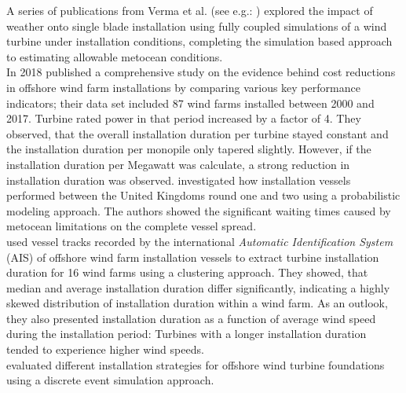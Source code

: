 \documentclass[wes, manuscript]{copernicus}
\begin{document}
A series of publications from Verma et al. (see e.g.: \citet{verma_numerical_2017, verma_response-based_2019, verma_comprehensive_2019, verma_impact_2019, verma_effects_2020}) explored the impact of weather onto single blade installation using fully coupled simulations of a wind turbine under installation conditions, completing the simulation based approach to estimating allowable metocean conditions.\\

In 2018 \citet{lacal-arantegui_offshore_2018} published a comprehensive study on the evidence behind cost reductions in offshore wind farm installations by comparing various key performance indicators; their data set included 87 wind farms installed between 2000 and 2017. Turbine rated power in that period increased by a factor of 4. They observed, that the overall installation duration per turbine stayed constant and the installation duration per monopile only tapered slightly. However, if the installation duration per Megawatt was calculate, a strong reduction in installation duration was observed. \citet{paterson_offshore_2018} investigated how installation vessels performed between the United Kingdoms round one and two using a probabilistic modeling approach. The authors showed the significant waiting times caused by metocean limitations on the complete vessel spread. \\

\citet{tranberg_determining_2019} used vessel tracks recorded by the international \textit{Automatic Identification System} (AIS) of offshore wind farm installation vessels to extract turbine installation duration for 16 wind farms using a clustering approach. They showed, that median and average installation duration differ significantly, indicating a highly skewed distribution of installation duration within a wind farm. As an outlook, they also presented installation duration as a function of average wind speed during the installation period: Turbines with a longer installation duration tended to experience higher wind speeds.\\

\citet{tjaberings_evaluating_2022} evaluated different installation strategies for offshore wind turbine foundations using a discrete event simulation approach. \\ %
\end{document}
